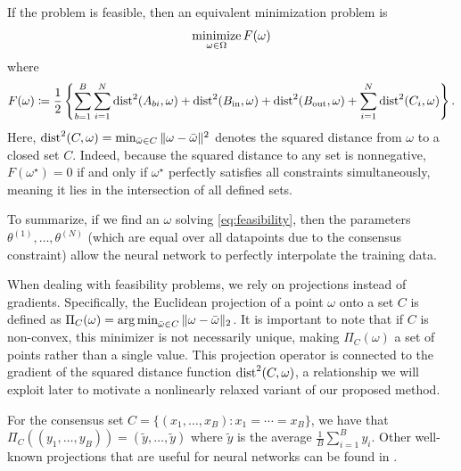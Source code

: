 If the problem is feasible, then an equivalent minimization problem is
\[
    \operatorname*{minimize}_{\omega\in\Omega} F(\omega)
\]
where
\[
    F(\omega) \coloneqq \frac{1}{2}\left\{\sum_{b=1}^B \sum_{i=1}^N \operatorname{dist}^2(A_{bi}, \omega)   + \operatorname{dist}^2(B_{\mathrm{in}}, \omega) + \operatorname{dist}^2(B_{\mathrm{out}}, \omega) + \sum_{i=1}^N \operatorname{dist}^2(C_i, \omega)\right\}.
\]
Here, $\operatorname{dist}^2(C, \omega) = \min_{\bar\omega\in C} \|\omega - \bar\omega\|^2$ denotes the squared distance from $\omega$ to a closed set $C$. Indeed, because the squared distance to any set is nonnegative, $F(\omega^\star) = 0$ if and only if $\omega^\star$ perfectly satisfies all constraints simultaneously, meaning it lies in the intersection of all defined sets.
\label{sec:feasibility}
\vspace{0.5em}
\begin{tcolorbox}
To summarize, if we find an $\omega$ solving \eqref{eq:feasibility}, then the parameters $\theta^{(1)},\ldots,\theta^{(N)}$ (which are equal over all datapoints due to the consensus constraint) allow the neural network to perfectly interpolate the training data.
\end{tcolorbox}
\vspace{0.5em}
When dealing with feasibility problems, we rely on projections instead of gradients. Specifically, the Euclidean projection of a point $\omega$ onto a set $C$ is defined as $\Pi_C(\omega) = \operatorname*{arg\,min}_{\bar \omega\in C} \|\omega - \bar\omega\|_2$. It is important to note that if $C$ is non-convex, this minimizer is not necessarily unique, making $\Pi_C(\omega)$ a set of points rather than a single value. This projection operator is connected to the gradient of the squared distance function $\operatorname{dist}^2(C,\omega)$, a relationship we will exploit later to motivate a nonlinearly relaxed variant of our proposed method.
\begin{example} \label{ex:consensus}
    For the consensus set $C = \{(x_1, \ldots, x_B) : x_1 = \cdots = x_B\}$, we have that $\Pi_C((y_1, \ldots, y_B)) = (\tilde y, \ldots, \tilde y)$ where $\tilde y$ is the average $\frac{1}{B}\sum_{i=1}^B y_i$. Other well-known projections that are useful for neural networks can be found in .
\end{example}

